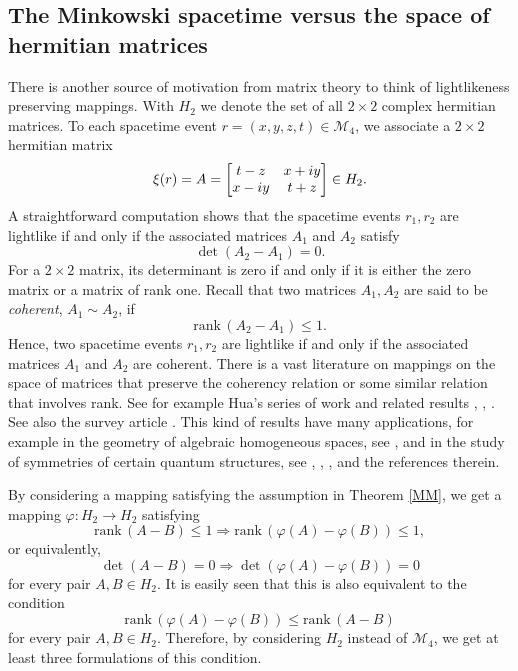 \documentclass[10pt,a4paper]{amsart}
\providecommand{\index}[1]{}
\theoremstyle{definition}
\theoremstyle{remark}
\numberwithin{subsection}{section}
\numberwithin{equation}{section}
\begin{document}
\subsection{The Minkowski spacetime versus the space of hermitian matrices}\label{vs}
There is another source of motivation from matrix theory to think of lightlikeness preserving mappings.
With $H_2$ \index{$H_2$} we denote the set of all $2 \times 2$ complex hermitian matrices.
To each spacetime event $r = (x,y,z,t) \in \mathcal{M}_4$, we associate a $2\times 2$ hermitian matrix
\begin{equation}\label{zacet}\index{$xi$@$\xi$}
\xi(r)=A= \left[ \begin{matrix}  t-z & x+iy \cr x-iy & t+z \cr\end{matrix} \right]\in H_2. 
\end{equation}
A straightforward computation shows that the spacetime
events $r_1 , r_2$ are lightlike if and only if the associated matrices $A_1$ and $A_2$ satisfy
\[
\det (A_2 - A_1) = 0.
\]
For a $2\times 2$ matrix, its determinant is zero if and only if it is either the zero matrix or a matrix of rank one. Recall that two matrices
$A_1 , A_2$ are said to be \emph{coherent}\index{coherent}, $A_1 \sim A_2$, \index{$\sim$1@$\sim$ (on $H_2$)} if
\[
\mathrm{rank}\, (A_2 - A_1 ) \le 1.
\]
Hence, two spacetime
events $r_1 , r_2$ are lightlike if and only if the associated matrices $A_1$ and $A_2$ are coherent.
There is a vast literature on mappings on the space of matrices that preserve the coherency relation or some similar relation that involves rank. 
See for example Hua's series of work \cite{Hu1,Hu2,Hu3,Hu4,Hu5,Hu6,Hu7,Hu8} and related results \cite{HuS}, \cite{SS}, \cite{Se3}. See also the survey article \cite{LP}. 
This kind of results have many applications, for example in the geometry of algebraic homogeneous spaces, see \cite{Cho}, and in the study of symmetries of certain quantum structures, see \cite{Mol}, \cite{Se1}, \cite{Se2}, and the references therein.

By considering a mapping satisfying the assumption in Theorem \ref{MM}, we get a mapping $\varphi\colon H_2\to H_2$ satisfying
\[
\mathrm{rank}\, (A - B ) \le 1 \Rightarrow \mathrm{rank}\, (\varphi(A) - \varphi(B))\leq 1,
\]
or equivalently, 
\begin{equation}\label{det}
\det (A - B ) = 0 \Rightarrow \det(\varphi(A) - \varphi(B))=0
\end{equation}
for every pair $A, B\in H_2$.
It is easily seen that this is also equivalent to the condition
\[
\mathrm{rank}\, (\varphi(A) - \varphi(B))\leq \mathrm{rank}\, (A - B )
\]
for every pair $A, B\in H_2$.
Therefore, by considering $H_2$ instead of $\mathcal{M}_4$, we get at least three formulations of this condition. 
\end{document}
